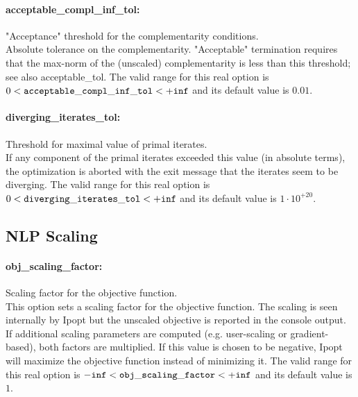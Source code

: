 \paragraph{acceptable\_compl\_inf\_tol:}\label{sec:acceptable_compl_inf_tol} "Acceptance" threshold for the complementarity conditions. $\;$ \\
 Absolute tolerance on the complementarity.
"Acceptable" termination requires that the
max-norm of the (unscaled) complementarity is
less than this threshold; see also
acceptable\_tol. The valid range for this real option is 
$0 <  {\tt acceptable\_compl\_inf\_tol } <  {\tt +inf}$
and its default value is $0.01$.


\paragraph{diverging\_iterates\_tol:}\label{sec:diverging_iterates_tol} Threshold for maximal value of primal iterates. $\;$ \\
 If any component of the primal iterates exceeded
this value (in absolute terms), the optimization
is aborted with the exit message that the
iterates seem to be diverging. The valid range for this real option is 
$0 <  {\tt diverging\_iterates\_tol } <  {\tt +inf}$
and its default value is $1 \cdot 10^{+20}$.


\subsection{NLP Scaling}

\paragraph{obj\_scaling\_factor:}\label{sec:obj_scaling_factor} Scaling factor for the objective function. $\;$ \\
 This option sets a scaling factor for the
objective function. The scaling is seen
internally by Ipopt but the unscaled objective is
reported in the console output. If additional
scaling parameters are computed (e.g.
user-scaling or gradient-based), both factors are
multiplied. If this value is chosen to be
negative, Ipopt will maximize the objective
function instead of minimizing it. The valid range for this real option is 
${\tt -inf} <  {\tt obj\_scaling\_factor } <  {\tt +inf}$
and its default value is $1$.


